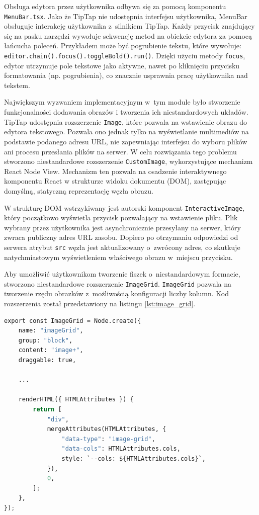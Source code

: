Obsługa edytora przez użytkownika odbywa się za pomocą komponentu \texttt{MenuBar.tsx}. Jako że TipTap 
nie udostępnia interfejsu użytkownika, MenuBar obsługuje interakcję użytkownika z~silnikiem TipTap. 
Każdy przycisk znajdujący się na pasku narzędzi wywołuje sekwencję metod na obiekcie edytora za pomocą 
łańcucha poleceń. Przykładem może być pogrubienie tekstu, które wywołuje: \texttt{editor.chain().focus().toggleBold().run()}. 
Dzięki użyciu metody \texttt{focus}, 
edytor utrzymuje pole tekstowe jako aktywne, nawet po kliknięciu przycisku formatowania (np. pogrubienia), 
co znacznie usprawnia pracę użytkownika nad tekstem.

Największym wyzwaniem implementacyjnym w~tym module było stworzenie funkcjonalności dodawania obrazów 
i tworzenia ich niestandardowych układów. TipTap udostępnia rozszerzenie \texttt{Image}, które pozwala na 
wstawienie obrazu do edytora tekstowego. Pozwala ono jednak tylko na wyświetlanie multimediów na podstawie 
podanego adresu URL, nie zapewniając interfejsu do wyboru plików ani procesu przesłania plików na serwer.
W celu rozwiązania tego problemu stworzono niestandardowe rozszerzenie \texttt{CustomImage}, wykorzystujące 
mechanizm React Node View. Mechanizm ten pozwala na osadzenie interaktywnego komponentu React 
w strukturze widoku dokumentu (DOM), zastępując domyślną, statyczną reprezentację węzła obrazu.

W strukturę DOM wstrzykiwany jest autorski komponent \texttt{InteractiveImage}, który początkowo wyświetla przycisk pozwalający na wstawienie pliku. 
Plik wybrany przez użytkownika jest asynchronicznie przesyłany na serwer, który zwraca publiczny adres URL zasobu. 
Dopiero po otrzymaniu odpowiedzi od serwera atrybut \texttt{src} węzła jest aktualizowany o~zwrócony adres, 
co skutkuje natychmiastowym wyświetleniem właściwego obrazu w~miejscu przycisku.

Aby umożliwić użytkownikom tworzenie fiszek o~niestandardowym formacie, stworzono niestandardowe rozszerzenie 
\texttt{ImageGrid}. \texttt{ImageGrid} pozwala na tworzenie rzędu obrazków z~możliwością konfiguracji liczby kolumn.
Kod rozszerzenia został przedstawiony na listingu \ref{lst:image_grid}.

\begin{lstlisting}[language=python, 
caption={Fragment autorskiego rozszerzenia ImageGrid}, 
label={lst:image_grid}]
export const ImageGrid = Node.create({
    name: "imageGrid",
    group: "block",
    content: "image+",
    draggable: true,

    ...

    renderHTML({ HTMLAttributes }) {
        return [
            "div",
            mergeAttributes(HTMLAttributes, {
                "data-type": "image-grid",
                "data-cols": HTMLAttributes.cols,
                style: `--cols: ${HTMLAttributes.cols}`,
            }),
            0,
        ];
    },
});
\end{lstlisting}


